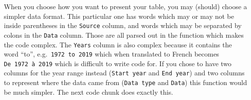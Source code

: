 \documentclass[12pt]{article}\usepackage[]{graphicx}\usepackage[]{color}
\newenvironment{Shaded}{\begin{snugshade}}{\end{snugshade}}
\newcommand{\AttributeTok}[1]{\textcolor[rgb]{0.77,0.63,0.00}{#1}}
\newcommand{\CommentTok}[1]{\textcolor[rgb]{0.56,0.35,0.01}{\textbf{#1}}}
\newcommand{\ConstantTok}[1]{\textcolor[rgb]{0.00,0.00,0.00}{#1}}
\newcommand{\ControlFlowTok}[1]{\textcolor[rgb]{0.13,0.29,0.53}{\textit{#1}}}
\newcommand{\DecValTok}[1]{\textcolor[rgb]{0.00,0.00,0.81}{#1}}
\newcommand{\FunctionTok}[1]{\textcolor[rgb]{0.00,0.00,0.00}{#1}}
\newcommand{\NormalTok}[1]{#1}
\newcommand{\OtherTok}[1]{\textcolor[rgb]{0.56,0.35,0.01}{#1}}
\newcommand{\SpecialCharTok}[1]{\textcolor[rgb]{0.00,0.00,0.00}{#1}}
\newcommand{\StringTok}[1]{\textcolor[rgb]{0.31,0.60,0.02}{#1}}
\begin{document}
When you choose how you want to present your table, you may (should) choose a simpler data format. This particular one has words which may or may not be inside parentheses in the \texttt{Source} column, and words which may be separated by colons in the \texttt{Data} column. Those are all parsed out in the function which makes the code complex. The \texttt{Years} column is also complex because it contains the word ``to'', e.g.~\texttt{1972\ to\ 2019} which when translated to French becomes \texttt{De\ 1972\ à\ 2019} which is difficult to write code for. If you chose to have two columns for the year range instead (\texttt{Start\ year} and \texttt{End\ year}) and two columns to represent where the data came from (\texttt{Data\ type} and \texttt{Data}) this function would be much simpler. The next code chunk does exactly this.
\begin{Shaded}
\end{Shaded}
\end{document}
